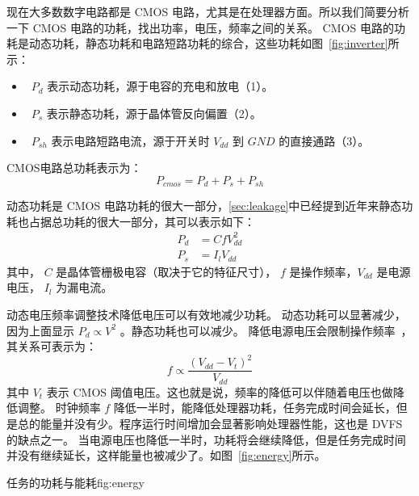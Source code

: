 现在大多数数字电路都是 CMOS 电路，尤其是在处理器方面。所以我们简要分析一下 CMOS 电路的功耗，找出功率，电压，频率之间的关系。
CMOS 电路的功耗是动态功耗，静态功耗和电路短路功耗的综合，这些功耗如图~\ref{fig:inverter}所示：
\begin{itemize}
\item  ~$P_d$ 表示动态功耗，源于电容的充电和放电（1）。
\item  ~$P_s$ 表示静态功耗，源于晶体管反向偏置（2）。
\item  ~$P_{sh}$ 表示电路短路电流，源于开关时 $V_{dd}$ 到 $GND$ 的直接通路（3）。
\end{itemize}
CMOS电路总功耗表示为：
\begin{equation}\label{eq:cmos}
P_{cmos} = P_d + P_s + P_{sh} 
\end{equation}


动态功耗是 CMOS 电路功耗的很大一部分，\ref{sec:leakage}中已经提到近年来静态功耗也占据总功耗的很大一部分，其可以表示如下：
\begin{equation}\label{eq:DVFS}
\begin{split}
P_d &= CfV_{dd}^2 \\
P_s &= I_lV_{dd}  
\end{split}
\end{equation}
其中，  $C$ 是晶体管栅极电容（取决于它的特征尺寸），
$f$ 是操作频率，$V_{dd}$ 是电源电压， $I_l$ 为漏电流。

动态电压频率调整技术降低电压可以有效地减少功耗。
动态功耗可以显著减少，因为上面显示 $P_d \propto V^2$ 。静态功耗也可以减少。
 降低电源电压会限制操作频率~，其关系可表示为：
 \begin{equation}\label{eq:fv}
 f \propto \frac{(V_{dd} - V_t)^2}{V_{dd}} 
 \end{equation}
 其中 $V_t$ 表示 CMOS 阈值电压。这也就是说，频率的降低可以伴随着电压也做降低调整。
 时钟频率 $f$ 降低一半时，能降低处理器功耗，任务完成时间会延长，但是总的能量并没有少。程序运行时间增加会显著影响处理器性能，这也是 DVFS 的缺点之一。
 当电源电压也降低一半时，功耗将会继续降低，但是任务完成时间并没有继续延长，这样能量也被减少了。如图~\ref{fig:energy}所示。
 
\begin{pics}{任务的功耗与能耗}{fig:energy}
\end{pics}

